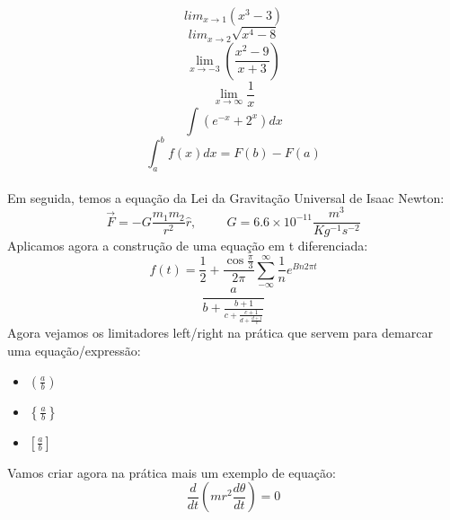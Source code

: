 \documentclass[a4paper, 12pt]{article}
\begin{document}
\begin{equation}
lim_{x \rightarrow 1}(x^{3} - 3)
\end{equation}
\vspace{0.5cm}
\begin{equation}
lim_{x \rightarrow 2}\sqrt{x^{4}-8}
\end{equation}
\vspace{0.5cm}
\begin{equation}
\lim_{x \rightarrow -3}\left(\frac{x^{2}-9}{x+3}\right)
\end{equation}
\vspace{0.5cm}
\begin{equation}
\lim_{x \rightarrow \infty}\frac{1}{x}
\end{equation}
\vspace{0.5cm}
\begin{equation}
\int(e^{-x} + 2^{x})dx 
\end{equation}
\vspace{0.5cm}
\begin{equation}
\int_{a}^{b}f(x)dx = F(b) - F(a)
\end{equation}\\
\vspace{0.5cm}
Em seguida, temos a equação da Lei da Gravitação Universal de Isaac Newton:
\begin{equation}
\vec{F} = -G\frac{m_{1}m_{2}}{r^{2}}\hat{r},\hspace{1cm} G = 6.6 \times 10^{-11}\frac{m^{3}}{Kg^{-1}s^{-2}}
\end{equation}
\vspace{0.5cm}
Aplicamos agora a construção de uma equação em t diferenciada:
\begin{equation}
f(t) = \frac{1}{2} + \frac{\cos\frac{\pi}{3}}{2\pi}\sum_{-\infty}^{\infty}\frac{1}{n}e^{Bn2\pi t}
\end{equation}
\vspace{0.5cm}
\begin{equation}
\frac{a}{b+\frac{b+1}{c+\frac{c+1}{d+\frac{d+1}{e}}}}
\end{equation}
\vspace{0.5cm}
Agora vejamos os limitadores left/right na prática que servem para demarcar uma equação/expressão:
\begin{itemize}
\item $\left(\frac{a}{b}\right)$
\item $\left\lbrace\frac{a}{b}\right\rbrace$
\item $\left[\frac{a}{b}\right]$
\end{itemize}
\vspace{0.5cm}
Vamos criar agora na prática mais um exemplo de equação:
\vspace{0.3cm}
\begin{equation}
\frac{d}{dt}\left(mr^{2}\frac{d\theta}{dt}\right) = 0
\end{equation}
\end{document}

